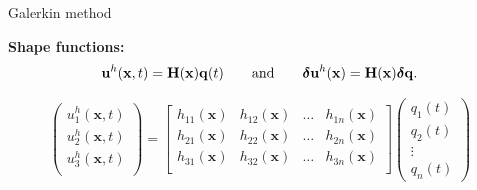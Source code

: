 \documentclass[aspectratio=169]{beamer}
\begin{document}
{{\begin{frame}{Galerkin method}
\begin{center}
      \end{center}
      \textbf{Shape functions:} $$\mathbf u^{h}(\mathbf x,t)=\mathbf H(\mathbf x)\mathbf q(t)\qquad\text{and}\qquad \boldsymbol\delta\mathbf u^{h}(\mathbf x)=\mathbf H(\mathbf x)\boldsymbol\delta\mathbf q.$$
      \vspace{-0.9cm}
      {\footnotesize
        \begin{block}{}
          $$
            \begin{pmatrix}
              u_{1}^{h}(\mathbf x,t) \\
              u_{2}^{h}(\mathbf x,t) \\
              u_{3}^{h}(\mathbf x,t) \\
            \end{pmatrix}
            =
            \begin{bmatrix}
              h_{11}(\mathbf x) & h_{12}(\mathbf x) & \dots & h_{1n}(\mathbf x) \\
              h_{21}(\mathbf x) & h_{22}(\mathbf x) & \dots & h_{2n}(\mathbf x) \\
              h_{31}(\mathbf x) & h_{32}(\mathbf x) & \dots & h_{3n}(\mathbf x) \\
            \end{bmatrix}
            \begin{pmatrix}
              q_{1}(t) \\
              q_{2}(t) \\
              \vdots   \\
              q_{n}(t)
            \end{pmatrix}
          $$


\end{block}}
\end{frame}}}
\end{document}

